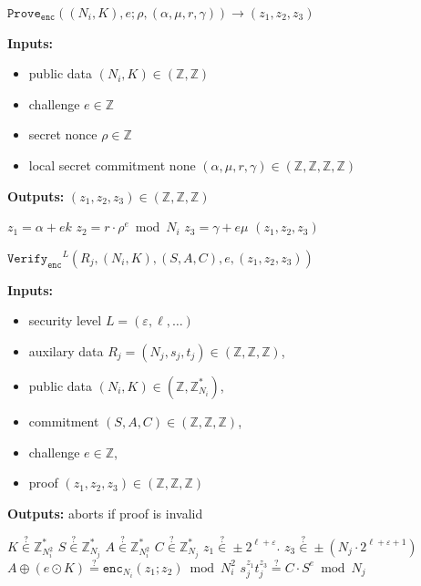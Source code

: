 \documentclass[11pt]{article}
\newenvironment{inlineAlgorithm}{}{}
\newcommand{\algoName}[1]{#1 \par}
\newcommand{\algoInputsList}[1]{
    {\small \bf Inputs:} 
        \begin{itemize}[noitemsep,topsep=0pt]
            #1
        \end{itemize}
}
\newcommand{\algoOutputs}[1]{
    {\small \bf Outputs:} #1 \par
}
\newcommand{\enc}{\ensuremath{\mathtt{enc}}}
\newcommand{\prove}[1]{\ensuremath{\mathtt{Prove}_{\mathtt{#1}}}}
\newcommand{\verify}[1]{\ensuremath{\mathtt{Verify}_{\mathtt{#1}}}}
\newcommand{\Z}{\mathbb{Z}}
\newcommand{\?}[1]{\stackrel{?}{#1}}
\begin{document}
\begin{description}
\begin{inlineAlgorithm}
\item
\begin{inlineAlgorithm}
\algoName{$\prove{enc}((N_i, K), e; \rho, (\alpha, \mu, r, \gamma)) \to (z_1, z_2, z_3)$}
\algoInputsList{
    \item public data $(N_i, K) \in (\Z, \Z)$
    \item challenge $e \in \Z$
    \item secret nonce $\rho \in \Z$
    \item local secret commitment none $(\alpha, \mu, r, \gamma) \in (\Z, \Z, \Z, \Z)$
}
\algoOutputs{$(z_1, z_2, z_3) \in (\Z, \Z, \Z)$}
\begin{algorithmic}[1]
\State $z_1 = \alpha + e k $
\State $z_2 = r \cdot \rho^e \bmod N_i $
\State $z_3 = \gamma + e \mu$
\State \Return $(z_1, z_2, z_3)$
\end{algorithmic}
\end{inlineAlgorithm}
\end{inlineAlgorithm}

\item
\begin{inlineAlgorithm}
\algoName{$\verify{enc}^L(R_j, (N_i, K), (S, A, C), e, (z_1, z_2, z_3))$}
\algoInputsList{
    \item security level $L = (\varepsilon, \ell, \dots)$
    \item auxilary data $R_j = (N_j, s_j, t_j) \in (\Z, \Z, \Z)$,
    \item public data $(N_i, K) \in (\Z, \Z^*_{N_i})$,
    \item commitment $(S, A, C) \in (\Z, \Z, \Z)$,
    \item challenge $e \in \Z$,
    \item proof $(z_1, z_2, z_3) \in (\Z, \Z, \Z)$
}
\algoOutputs{aborts if proof is invalid}
\begin{algorithmic}[1]
\State $K \? \in \Z^*_{N_i^2}$
\State $S \? \in \Z^*_{N_j}$
\State $A \? \in \Z^*_{N_i^2}$
\State $C \? \in \Z^*_{N_j}$
\State $z_1 \? \in \pm 2^{\ell + \varepsilon}$.
\State $z_3 \? \in \pm (N_j \cdot 2^{\ell + \varepsilon + 1})$
\State $A \oplus (e \odot K) \? = \enc_{N_i}(z_1; z_2) \bmod N_i^2$
\State $s_j^{z_1} t_j^{z_3} \? = C \cdot S^e \bmod N_j$ 
\end{algorithmic}
\end{inlineAlgorithm}

\end{description}
\end{document}
